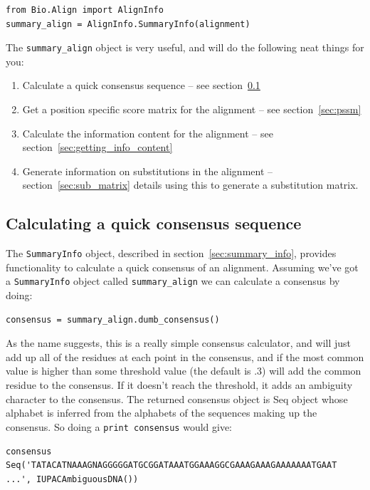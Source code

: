 \documentclass{report}
\begin{document}
\begin{verbatim}
from Bio.Align import AlignInfo
summary_align = AlignInfo.SummaryInfo(alignment)
\end{verbatim}

The \verb|summary_align| object is very useful, and will do the following neat things for you:

\begin{enumerate}
  \item Calculate a quick consensus sequence -- see section~\ref{sec:consensus}
  \item Get a position specific score matrix for the alignment -- see section~\ref{sec:pssm}
  \item Calculate the information content for the alignment -- see section~\ref{sec:getting_info_content}
  \item Generate information on substitutions in the alignment -- section~\ref{sec:sub_matrix} details using this to generate a substitution matrix.
\end{enumerate}

\subsection{Calculating a quick consensus sequence}
\label{sec:consensus}

The \verb|SummaryInfo| object, described in section~\ref{sec:summary_info}, provides functionality to calculate a quick consensus of an alignment. Assuming we've got a \verb|SummaryInfo| object called \verb|summary_align| we can calculate a consensus by doing:

\begin{verbatim}
consensus = summary_align.dumb_consensus()
\end{verbatim}

As the name suggests, this is a really simple consensus calculator, and will just add up all of the residues at each point in the consensus, and if the most common value is higher than some threshold value (the default is .3) will add the common residue to the consensus. If it doesn't reach the threshold, it adds an ambiguity character to the consensus. The returned consensus object is Seq object whose alphabet is inferred from the alphabets of the sequences making up the consensus. So doing a \verb|print consensus| would give:

\begin{verbatim}
consensus Seq('TATACATNAAAGNAGGGGGATGCGGATAAATGGAAAGGCGAAAGAAAGAAAAAAATGAAT 
...', IUPACAmbiguousDNA())
\end{verbatim} 
\end{document}
